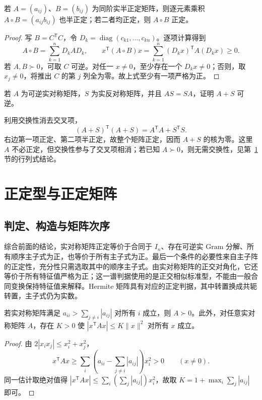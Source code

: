\begin{theorem}
\label{thm:xie-ex-qf-hadamard-product}
若 $A=(a_{ij})$、$B=(b_{ij})$ 为同阶实半正定矩阵，则逐元素乘积 $A\circ B=(a_{ij}b_{ij})$ 也半正定；若二者均正定，则 $A\circ B$ 正定。
\end{theorem}
\begin{proof}
写 $B=C^{\mathsf T}C$，令 $D_k=\operatorname{diag}(c_{k1},\ldots,c_{kn})$。逐项计算得到
\[
 A\circ B=\sum_{k=1}^nD_kAD_k,
 \qquad x^{\mathsf T}(A\circ B)x=\sum_{k=1}^n(D_kx)^{\mathsf T}A(D_kx)\ge0.
\]
若 $A,B\succ0$，可取 $C$ 可逆。对任一 $x\ne0$，至少存在一个 $D_kx\ne0$；否则，取 $x_j\ne0$，将推出 $C$ 的第 $j$ 列全为零。故上式至少有一项严格为正。
\end{proof}

\begin{example}
若 $A$ 为可逆实对称矩阵，$S$ 为实反对称矩阵，并且 $AS=SA$，证明 $A+S$ 可逆。
\end{example}
\begin{solve}
利用交换性消去交叉项，
\[
 (A+S)^{\mathsf T}(A+S)=A^{\mathsf T}A+S^{\mathsf T}S.
\]
右边第一项正定、第二项半正定，故整个矩阵正定，因而 $A+S$ 的核为零。这里 $A$ 不必正定，但交换性参与了交叉项相消；若已知 $A\succ0$，则无需交换性，见第~\ref{sec:xie-ex-qf-positive} 节的行列式结论。
\end{solve}

\section{正定型与正定矩阵}
\label{sec:xie-ex-qf-positive}

\subsection{判定、构造与矩阵次序}

综合前面的结论，实对称矩阵正定等价于合同于 $I_n$、存在可逆实 Gram 分解、所有顺序主子式为正，也等价于所有主子式为正。最后一个条件的必要性来自主子阵的正定性，充分性只需选取其中的顺序主子式。由实对称矩阵的正交对角化，它还等价于所有特征值严格为正；这一谱判据使用的是正交相似标准型，不能由一般合同变换保持特征值来解释。Hermite 矩阵具有对应的正定判据，其中转置换成共轭转置，主子式仍为实数。

\begin{proposition}
\label{prop:xie-ex-qf-diagonal-dominance}
若实对称矩阵满足 $a_{ii}>\sum_{j\ne i}|a_{ij}|$ 对所有 $i$ 成立，则 $A\succ0$。此外，对任意实对称矩阵 $A$，存在 $K>0$ 使 $|x^{\mathsf T}Ax|\le K\|x\|^2$ 对所有 $x$ 成立。
\end{proposition}
\begin{proof}
由 $2|x_ix_j|\le x_i^2+x_j^2$，
\[
 x^{\mathsf T}Ax\ge\sum_i\left(a_{ii}-\sum_{j\ne i}|a_{ij}|\right)x_i^2>0\qquad(x\ne0).
\]
同一估计取绝对值得 $|x^{\mathsf T}Ax|\le\sum_i(\sum_j|a_{ij}|)x_i^2$，故取 $K=1+\max_i\sum_j|a_{ij}|$ 即可。
\end{proof}

